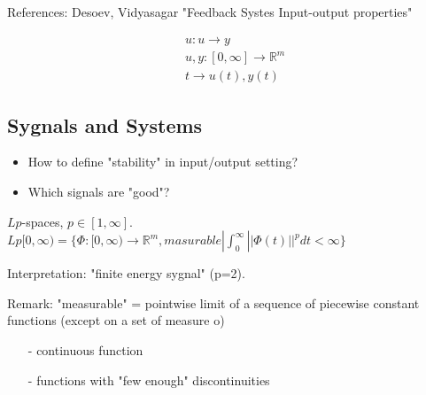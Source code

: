 References: Desoev, Vidyasagar "Feedback Systes Input-output properties"


\begin{equation*}
\begin{split}
&u: u\rightarrow y \\
&u,y:[0,\infty]\rightarrow \mathbb{R}^m \\
&t \rightarrow u(t), y(t)
\end{split}
\end{equation*}

\subsection{Sygnals and Systems}

\begin{itemize}
\item How to define "stability" in input/output setting?
\item Which signals are "good"?
\end{itemize}

\begin{Definition}
 $Lp$-spaces, $p\in[1,\infty]$. 
 $Lp[0,\infty) = \{\Phi:[0,\infty)\rightarrow\mathbb{R}^m, masurable|
  \int_0^\infty ||\Phi(t)||^p dt < \infty\}$
\end{Definition}

Interpretation: "finite energy sygnal" (p=2).

Remark: "measurable" = pointwise limit of a sequence of piecewise constant functions
(except on a set of measure o)

\begin{Example}


\begin{itemize}
 \item[-] continuous function
 \item[-] functions with "few enough" discontinuities
\end{itemize}
\end{Example}

